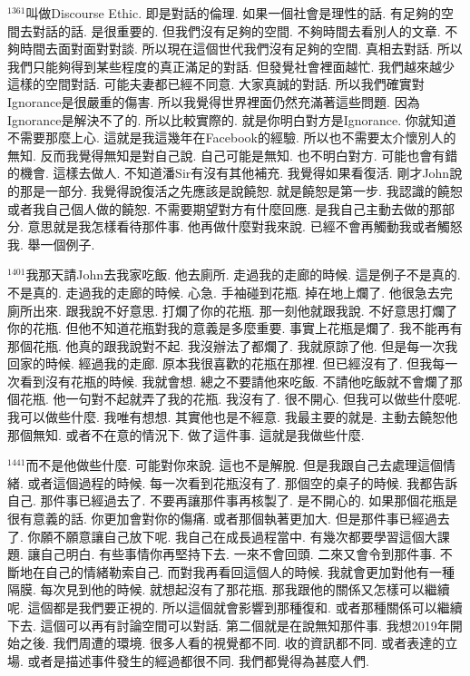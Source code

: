 \documentclass{book}
\begin{document}
$^{1361}$叫做Discourse Ethic.
即是對話的倫理.
如果一個社會是理性的話.
有足夠的空間去對話的話.
是很重要的.
但我們沒有足夠的空間.
不夠時間去看別人的文章.
不夠時間去面對面對對談.
所以現在這個世代我們沒有足夠的空間.
真相去對話.
所以我們只能夠得到某些程度的真正滿足的對話.
但發覺社會裡面越忙.
我們越來越少這樣的空間對話.
可能夫妻都已經不同意.
大家真誠的對話.
所以我們確實對Ignorance是很嚴重的傷害.
所以我覺得世界裡面仍然充滿著這些問題.
因為Ignorance是解決不了的.
所以比較實際的.
就是你明白對方是Ignorance.
你就知道不需要那麼上心.
這就是我這幾年在Facebook的經驗.
所以也不需要太介懷別人的無知.
反而我覺得無知是對自己說.
自己可能是無知.
也不明白對方.
可能也會有錯的機會.
這樣去做人.
不知道潘Sir有沒有其他補充.
我覺得如果看復活.
剛才John說的那是一部分.
我覺得說復活之先應該是說饒恕.
就是饒恕是第一步.
我認識的饒恕或者我自己個人做的饒恕.
不需要期望對方有什麼回應.
是我自己主動去做的那部分.
意思就是我怎樣看待那件事.
他再做什麼對我來說.
已經不會再觸動我或者觸怒我.
舉一個例子.

$^{1401}$我那天請John去我家吃飯.
他去廁所.
走過我的走廊的時候.
這是例子不是真的.
不是真的.
走過我的走廊的時候.
心急.
手袖碰到花瓶.
掉在地上爛了.
他很急去完廁所出來.
跟我說不好意思.
打爛了你的花瓶.
那一刻他就跟我說.
不好意思打爛了你的花瓶.
但他不知道花瓶對我的意義是多麼重要.
事實上花瓶是爛了.
我不能再有那個花瓶.
他真的跟我說對不起.
我沒辦法了都爛了.
我就原諒了他.
但是每一次我回家的時候.
經過我的走廊.
原本我很喜歡的花瓶在那裡.
但已經沒有了.
但我每一次看到沒有花瓶的時候.
我就會想.
總之不要請他來吃飯.
不請他吃飯就不會爛了那個花瓶.
他一句對不起就弄了我的花瓶.
我沒有了.
很不開心.
但我可以做些什麼呢.
我可以做些什麼.
我唯有想想.
其實他也是不經意.
我最主要的就是.
主動去饒恕他那個無知.
或者不在意的情況下.
做了這件事.
這就是我做些什麼.

$^{1441}$而不是他做些什麼.
可能對你來說.
這也不是解脫.
但是我跟自己去處理這個情緒.
或者這個過程的時候.
每一次看到花瓶沒有了.
那個空的桌子的時候.
我都告訴自己.
那件事已經過去了.
不要再讓那件事再核製了.
是不開心的.
如果那個花瓶是很有意義的話.
你更加會對你的傷痛.
或者那個執著更加大.
但是那件事已經過去了.
你願不願意讓自己放下呢.
我自己在成長過程當中.
有幾次都要學習這個大課題.
讓自己明白.
有些事情你再堅持下去.
一來不會回頭.
二來又會令到那件事.
不斷地在自己的情緒勒索自己.
而對我再看回這個人的時候.
我就會更加對他有一種隔膜.
每次見到他的時候.
就想起沒有了那花瓶.
那我跟他的關係又怎樣可以繼續呢.
這個都是我們要正視的.
所以這個就會影響到那種復和.
或者那種關係可以繼續下去.
這個可以再有討論空間可以對話.
第二個就是在說無知那件事.
我想2019年開始之後.
我們周遭的環境.
很多人看的視覺都不同.
收的資訊都不同.
或者表達的立場.
或者是描述事件發生的經過都很不同.
我們都覺得為甚麼人們.
\end{document}
